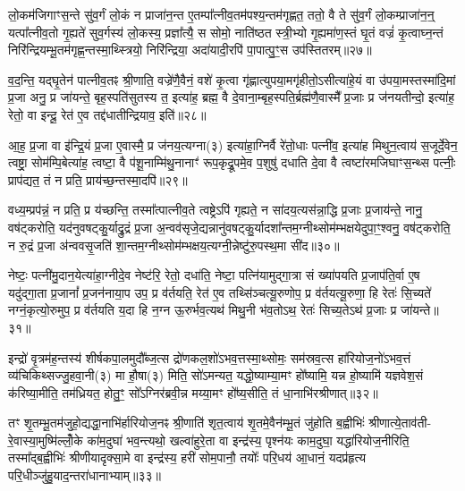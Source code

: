 लो॒कम॑जिगाꣳस॒न्ते सु॑व॒र्गं लो॒कं न प्राजा॑न॒न्त ए॒तम्पा᳚त्नीव॒तम॑पश्य॒न्तम॑गृह्णत॒ ततो॒ वै ते सु॑व॒र्गं लो॒कम्प्राजा॑न॒न्॒ यत्पा᳚त्नीव॒तो गृ॒ह्यते॑ सुव॒र्गस्य॑ लो॒कस्य॒ प्रज्ञा᳚त्यै॒ स सोमो॒ नाति॑ष्ठत स्त्री॒भ्यो गृ॒ह्यमा॑ण॒स्तं घृ॒तं वज्रं॑ कृ॒त्वाघ्न॒न्तं निरि॑न्द्रियम्भू॒तम॑गृह्ण॒न्तस्मा॒थ्स्त्रियो॒ निरि॑न्द्रिया॒ अदा॑यादी॒रपि॑ पा॒पात्पु॒ꣳ॒स उप॑स्तितरम्॥२७॥

व॒द॒न्ति॒ यद्घृ॒तेन॑ पात्नीव॒तꣴ श्री॒णाति॒ वज्रे॑णै॒वैनं॒ वशे॑ कृ॒त्वा गृ॑ह्णात्युपया॒मगृ॑हीतो॒\-ऽसीत्या॑हे॒यं वा उ॑पया॒मस्तस्मा॑दि॒मां प्र॒जा अनु॒ प्र जा॑यन्ते॒ बृह॒स्पति॑सुतस्य त॒ इत्या॑ह॒ ब्रह्म॒ वै दे॒वाना॒म्बृह॒स्पति॒र्ब्रह्म॑णै॒वास्मै᳚ प्र॒जाः प्र ज॑नयतीन्दो॒ इत्या॑ह॒ रेतो॒ वा इन्दू॒ रेत॑ ए॒व तद्द॑धातीन्द्रियाव॒ इति॑॥२८॥

आ॒ह॒ प्र॒जा वा इ॑न्द्रि॒यं प्र॒जा ए॒वास्मै॒ प्र ज॑नय॒त्यग्ना(३) इत्या॑हा॒ग्निर्वै रे॑तो॒धाः पत्नी॑व॒ इत्या॑ह मिथुन॒त्वाय॑ स॒जूर्दे॒वेन॒ त्वष्ट्रा॒ सोम॑म्पि॒बेत्या॑ह॒ त्वष्टा॒ वै प॑शू॒नाम्मि॑थु॒नानाꣳ॑ रूप॒कृद्रू॒पमे॒व प॒शुषु॑ दधाति दे॒वा वै त्वष्टा॑रमजिघाꣳस॒न्थ्स पत्नीः॒ प्राप॑द्यत॒ तं न प्रति॒ प्राय॑च्छ॒न्तस्मा॒दपि॑॥२९॥

वध्य॒म्प्रप॑न्नं॒ न प्रति॒ प्र य॑च्छन्ति॒ तस्मा᳚त्पात्नीव॒ते त्वष्ट्रे\-ऽपि॑ गृह्यते॒ न सा॑दय॒त्यस॑न्ना॒द्धि प्र॒जाः प्र॒जाय॑न्ते॒ नानु॒ वष॑ट्करोति॒ यद॑नुवषट्कु॒र्याद्रु॒द्रं प्र॒जा अ॒न्वव॑सृजे॒द्यन्नानु॑वषट्कु॒र्यादशा᳚न्तम॒ग्नीथ्सोम॑म्भक्षयेदुपा॒ꣳ॒श्वनु॒ वष॑ट्करोति॒ न रु॒द्रं प्र॒जा अ॑न्ववसृ॒जति॑ शा॒न्तम॒ग्नीथ्सोम॑म्भक्षय॒त्यग्नी॒न्नेष्टु॑रु॒पस्थ॒मा सी॑द॥३०॥

नेष्टः॒ पत्नी॑मु॒दान॒येत्या॑हा॒ग्नीदे॒व नेष्ट॑रि॒ रेतो॒ दधा॑ति॒ नेष्टा॒ पत्नि॑यामुद्गा॒त्रा सं ख्या॑पयति प्र॒जाप॑ति॒र्वा ए॒ष यदु॑द्गा॒ता प्र॒जानां᳚ प्र॒जन॑नाया॒प उप॒ प्र व॑र्तयति॒ रेत॑ ए॒व तथ्सि॑ञ्चत्यू॒रुणोप॒ प्र व॑र्तयत्यू॒रुणा॒ हि रेतः॑ सि॒च्यते॑ नग्नं॒कृत्यो॒रुमुप॒ प्र व॑र्तयति य॒दा हि न॒ग्न ऊ॒रुर्भव॒त्यथ॑ मिथु॒नी भ॑व॒तो\-ऽथ॒ रेतः॑ सिच्य॒ते\-ऽथ॑ प्र॒जाः प्र जा॑यन्ते॥३१॥

{\anuvakamend[{पत्नीः᳚ सुव॒र्गमुप॑स्तितरमिन्द्रियाव॒ इत्यपि॑ सीद मिथु॒न्य॑ष्टौ च॑॥८॥}]}

इन्द्रो॑ वृ॒त्रम॑ह॒न्तस्य॑ शीर्\mbox{}षकपा॒लमुदौ᳚ब्ज॒त्स द्रो॑णकल॒शो॑\-ऽभव॒त्तस्मा॒थ्सोमः॒ सम॑स्रव॒त्स हा॑रियोज॒नो॑\-ऽभव॒त्तं व्य॑चिकिथ्सज्जु॒हवा॒नी(३) मा हौ॒षा(३) मिति॒ सो॑\-ऽमन्यत॒ यद्धो॒ष्याम्या॒मꣳ हो᳚ष्यामि॒ यन्न हो॒ष्यामि॑ यज्ञवेश॒सं क॑रिष्या॒मीति॒ तम॑ध्रियत॒ होतु॒ꣳ॒ सो᳚\-ऽग्निर॑ब्रवी॒न्न मय्या॒मꣳ हो᳚ष्य॒सीति॒ तं धा॒नाभि॑रश्रीणात्॥३२॥

तꣳ शृ॒तम्भू॒तम॑जुहो॒द्यद्धा॒नाभि॑र्\mbox{}हारियोज॒नꣴ श्री॒णाति॑ शृत॒त्वाय॑ शृ॒तमे॒वैन॑म्भू॒तं जु॑होति ब॒ह्वीभिः॑ श्रीणात्ये॒ताव॑ती- रे॒वास्या॒मुष्मि॑ल्लोँ॒के का॑म॒दुघा॑ भव॒न्त्यथो॒ खल्वा॑हुरे॒ता वा इन्द्र॑स्य॒ पृश्न॑यः काम॒दुघा॒ यद्धा॑रियोज॒नीरिति॒ तस्मा᳚द्ब॒ह्वीभिः॑ श्रीणीयादृक्सा॒मे वा इन्द्र॑स्य॒ हरी॑ सोम॒पानौ॒ तयोः᳚ परि॒धय॑ आ॒धानं॒ यदप्र॑हृत्य परि॒धीञ्जु॑हु॒याद॒न्तरा॑धानाभ्याम्॥३३॥

